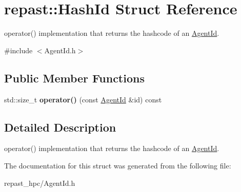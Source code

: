 \hypertarget{structrepast_1_1_hash_id}{\section{repast\-:\-:Hash\-Id Struct Reference}
\label{structrepast_1_1_hash_id}
}


operator() implementation that returns the hashcode of an \hyperlink{classrepast_1_1_agent_id}{Agent\-Id}.  




{\ttfamily \#include $<$Agent\-Id.\-h$>$}

\subsection*{Public Member Functions}
\begin{DoxyCompactItemize}
\item 
\hypertarget{structrepast_1_1_hash_id_a202dfae6a775fc9189f0810a6cdfc329}{std\-::size\-\_\-t {\bfseries operator()} (const \hyperlink{classrepast_1_1_agent_id}{Agent\-Id} \&id) const }\label{structrepast_1_1_hash_id_a202dfae6a775fc9189f0810a6cdfc329}

\end{DoxyCompactItemize}


\subsection{Detailed Description}
operator() implementation that returns the hashcode of an \hyperlink{classrepast_1_1_agent_id}{Agent\-Id}. 

The documentation for this struct was generated from the following file\-:\begin{DoxyCompactItemize}
\item 
repast\-\_\-hpc/Agent\-Id.\-h\end{DoxyCompactItemize}
